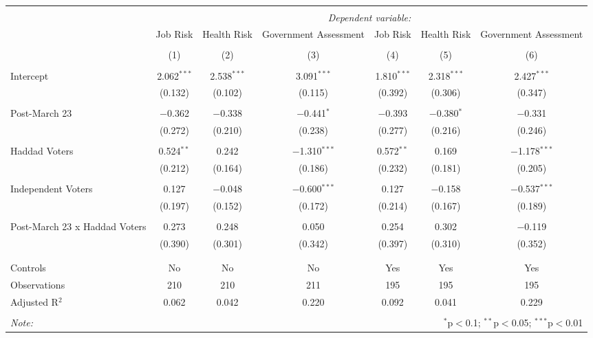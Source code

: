 
\begin{table}[!htbp] \centering 
  \caption{} 
  \label{} 
\begin{tabular}{@{\extracolsep{5pt}}lcccccc} 
\\[-1.8ex]\hline 
\hline \\[-1.8ex] 
 & \multicolumn{6}{c}{\textit{Dependent variable:}} \\ 
\cline{2-7} 
 & Job Risk & Health Risk & Government Assessment & Job Risk & Health Risk & Government Assessment \\ 
\\[-1.8ex] & (1) & (2) & (3) & (4) & (5) & (6)\\ 
\hline \\[-1.8ex] 
 Intercept & 2.062$^{***}$ & 2.538$^{***}$ & 3.091$^{***}$ & 1.810$^{***}$ & 2.318$^{***}$ & 2.427$^{***}$ \\ 
  & (0.132) & (0.102) & (0.115) & (0.392) & (0.306) & (0.347) \\ 
  & & & & & & \\ 
 Post-March 23 & $-$0.362 & $-$0.338 & $-$0.441$^{*}$ & $-$0.393 & $-$0.380$^{*}$ & $-$0.331 \\ 
  & (0.272) & (0.210) & (0.238) & (0.277) & (0.216) & (0.246) \\ 
  & & & & & & \\ 
 Haddad Voters & 0.524$^{**}$ & 0.242 & $-$1.310$^{***}$ & 0.572$^{**}$ & 0.169 & $-$1.178$^{***}$ \\ 
  & (0.212) & (0.164) & (0.186) & (0.232) & (0.181) & (0.205) \\ 
  & & & & & & \\ 
 Independent Voters & 0.127 & $-$0.048 & $-$0.600$^{***}$ & 0.127 & $-$0.158 & $-$0.537$^{***}$ \\ 
  & (0.197) & (0.152) & (0.172) & (0.214) & (0.167) & (0.189) \\ 
  & & & & & & \\ 
 Post-March 23 x Haddad Voters & 0.273 & 0.248 & 0.050 & 0.254 & 0.302 & $-$0.119 \\ 
  & (0.390) & (0.301) & (0.342) & (0.397) & (0.310) & (0.352) \\ 
  & & & & & & \\ 
\hline \\[-1.8ex] 
Controls & No & No & No & Yes & Yes & Yes \\ 
Observations & 210 & 210 & 211 & 195 & 195 & 195 \\ 
Adjusted R$^{2}$ & 0.062 & 0.042 & 0.220 & 0.092 & 0.041 & 0.229 \\ 
\hline 
\hline \\[-1.8ex] 
\textit{Note:}  & \multicolumn{6}{r}{$^{*}$p$<$0.1; $^{**}$p$<$0.05; $^{***}$p$<$0.01} \\ 
\end{tabular} 
\end{table} 

